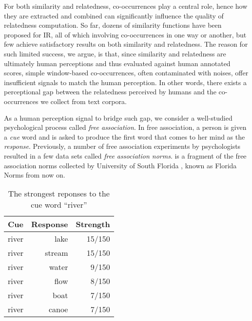 For both similarity and relatedness, co-occurrences play a central
role, hence how they are extracted and combined can significantly
influence the quality of relatedness computation. 
So far, dozens of similarity functions
\cite{mcgill1979evaluation} 
have been proposed for IR, all of which involving co-occurrences in
one way or another, but few achieve satisfactory results on both
similarity and relatedness. The reason for such limited success, we
argue, is that, since similarity and relatedness are ultimately
human perceptions and thus evaluated against human annotated scores,
simple window-based co-occurrences, often contaminated with noises, offer insufficient signals to
match the human perception. In other words, there exists a
perceptional gap between the relatedness perceived by humans and the
co-occurrences we collect from text corpora.

As a human perception signal to bridge such gap, we consider a
well-studied psychological process called {\em free association}. In
free association, a person is given a {\em cue} word and is asked to
produce the first word that comes to her mind as the {\em response}. Previously, a number
of free association experiments by psychologists
resulted in a few data sets called {\em free association norms}.
 is a fragment of the free association norms collected by
University of South Florida \cite{Nelson:2004}, known as Florida
Norms from now on.

\begin{table}[ht]
\begin{center}
\caption{The strongest reponses to the cue word ``river''}
\begin{tabular}{lrr}\hline
Cue &   Response    &Strength \\\hline
river&    lake&       15/150 \\
river&    stream&      15/150\\
river&    water&      9/150\\
river&    flow&    8/150\\
river&    boat&       7/150\\
river&    canoe&        7/150\\
\hline
\end{tabular}
\end{center}
\label{tab:florida}
\end{table}

